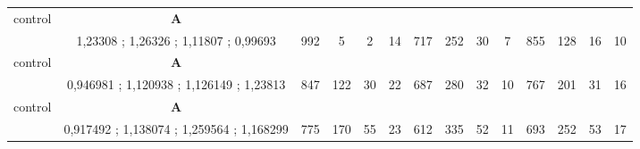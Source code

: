 \begin{table}[H]
{\begin{tabular}{|c|c|c|c|c|c|c|c|c|c|c|c|c|c|}
control & \cellcolor{blue!15}\textbf{A}& {\color[HTML]{00009B} } & {\color[HTML]{9A0000} } & {\color[HTML]{009901} } &  & {\color[HTML]{00009B} } & {\color[HTML]{9A0000} } & {\color[HTML]{009901} } &  & {\color[HTML]{00009B} } & {\color[HTML]{9A0000} } & {\color[HTML]{009901} } &  \\ 
 & \cellcolor{ blue!15}1,23308 ; 1,26326 ; 1,11807 ; 0,99693 & \multirow{-2}{*}{{\color[HTML]{00009B} 992}} & \multirow{-2}{*}{{\color[HTML]{9A0000} 5}} & \multirow{-2}{*}{{\color[HTML]{009901} 2}} & \multirow{-2}{*}{14} & \multirow{-2}{*}{{\color[HTML]{00009B} 717}} & \multirow{-2}{*}{{\color[HTML]{9A0000} 252}} & \multirow{-2}{*}{{\color[HTML]{009901} 30}} & \multirow{-2}{*}{7} & \multirow{-2}{*}{{\color[HTML]{00009B} 855}} & \multirow{-2}{*}{{\color[HTML]{9A0000} 128}} & \multirow{-2}{*}{{\color[HTML]{009901} 16}} & \multirow{-2}{*}{10} \\ \hline

control & \cellcolor{blue!15}\textbf{A}& {\color[HTML]{00009B} } & {\color[HTML]{9A0000} } & {\color[HTML]{009901} } &  & {\color[HTML]{00009B} } & {\color[HTML]{9A0000} } & {\color[HTML]{009901} } &  & {\color[HTML]{00009B} } & {\color[HTML]{9A0000} } & {\color[HTML]{009901} } &  \\ 
 & \cellcolor{ blue!15}0,946981 ; 1,120938 ; 1,126149 ; 1,23813 & \multirow{-2}{*}{{\color[HTML]{00009B} 847}} & \multirow{-2}{*}{{\color[HTML]{9A0000} 122}} & \multirow{-2}{*}{{\color[HTML]{009901} 30}} & \multirow{-2}{*}{22} & \multirow{-2}{*}{{\color[HTML]{00009B} 687}} & \multirow{-2}{*}{{\color[HTML]{9A0000} 280}} & \multirow{-2}{*}{{\color[HTML]{009901} 32}} & \multirow{-2}{*}{10} & \multirow{-2}{*}{{\color[HTML]{00009B} 767}} & \multirow{-2}{*}{{\color[HTML]{9A0000} 201}} & \multirow{-2}{*}{{\color[HTML]{009901} 31}} & \multirow{-2}{*}{16} \\ \hline

control & \cellcolor{blue!15}\textbf{A}& {\color[HTML]{00009B} } & {\color[HTML]{9A0000} } & {\color[HTML]{009901} } &  & {\color[HTML]{00009B} } & {\color[HTML]{9A0000} } & {\color[HTML]{009901} } &  & {\color[HTML]{00009B} } & {\color[HTML]{9A0000} } & {\color[HTML]{009901} } &  \\ 
 & \cellcolor{ blue!15}0,917492 ; 1,138074 ; 1,259564 ; 1,168299 & \multirow{-2}{*}{{\color[HTML]{00009B} 775}} & \multirow{-2}{*}{{\color[HTML]{9A0000} 170}} & \multirow{-2}{*}{{\color[HTML]{009901} 55}} & \multirow{-2}{*}{23} & \multirow{-2}{*}{{\color[HTML]{00009B} 612}} & \multirow{-2}{*}{{\color[HTML]{9A0000} 335}} & \multirow{-2}{*}{{\color[HTML]{009901} 52}} & \multirow{-2}{*}{11} & \multirow{-2}{*}{{\color[HTML]{00009B} 693}} & \multirow{-2}{*}{{\color[HTML]{9A0000} 252}} & \multirow{-2}{*}{{\color[HTML]{009901} 53}} & \multirow{-2}{*}{17} \\ \hline



\end{tabular}}
\end{table}
